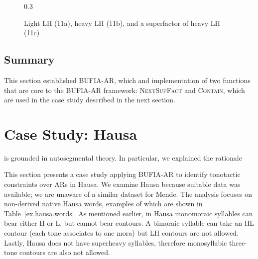 \begin{figure}[ht]
\begin{subtable}[t]{0.3\textwidth}
		\subcaption{}
		\label{fig:matrix-super}
	\end{subtable}
	\hfill
	\caption{Light LH (11a), heavy LH (11b), 
	and a superfactor of heavy LH (11c)}
	\label{fig:matrixmatching}
\end{figure}


\subsection{Summary}
This section established BUFIA-AR, which and implementation 
of two functions that are core to the BUFIA-AR framework: 
\textsc{NextSupFact} and \textsc{Contain}, which are 
used in the case study described in the next section.


\section{Case Study: Hausa} \label{sec:hausa} is grounded in autosegmental 
theory. In particular, we explained the rationale

This section presents a case study applying BUFIA-AR to identify
tonotactic constraints over ARs in Hausa. We examine Hausa because
suitable data was available; we are unaware of a similar dataset for
Mende. The analysis focuses on non-derived native Hausa words,
examples of which are shown in Table~\ref{ex.hausa.words}. As mentioned
earlier, in Hausa monomoraic syllables can bear either H or L, but
cannot bear contours. A bimoraic syllable can take an HL contour (each
tone associates to one mora) but LH contours are not allowed. Lastly,
Hausa does not have superheavy syllables, therefore monosyllabic
three-tone contours are also not allowed.  


